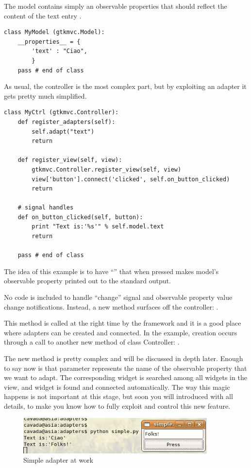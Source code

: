 The model contains simply an observable properties that should
reflect the content of the text entry .

{ \codesize
\begin{verbatim}
class MyModel (gtkmvc.Model):
    __properties__ = {
        'text' : "Ciao",
        }
    pass # end of class
\end{verbatim}
}

As usual, the controller is the most complex part, but by exploiting
an adapter it gets pretty much simplified. 
{ \codesize
\begin{verbatim}
class MyCtrl (gtkmvc.Controller):
    def register_adapters(self):
        self.adapt("text")
        return

    def register_view(self, view):
        gtkmvc.Controller.register_view(self, view)
        view['button'].connect('clicked', self.on_button_clicked)
        return

    # signal handles
    def on_button_clicked(self, button):
        print "Text is:'%s'" % self.model.text
        return

    pass # end of class
\end{verbatim}
}

The idea of this example is to have ``''
that when pressed makes model's observable property 
printed out to the standard output.

No code is included to handle  ``change''
signal and observable property value change notifications. Instead,
a new method surfaces off the controller:
.

This method is called at the right time by the framework and it is a
good place where adapters can be created and connected. In the
example, creation occurs through a call to another new method of
class Controller: . 

The new method is pretty complex and will be discussed in depth
later. Enough to say now is that parameter 
represents the name of the observable property that we want to
adapt. The corresponding widget is searched among all widgets in the
view, and widget  is found and connected
automatically. The way this magic happens is not important at this
stage, but soon you will introduced with all details, to make you
know how to fully exploit and control this new feature.

\begin{figure}[htbp]
\begin{center}
\includegraphics[width=10cm]{figs/png/adap1}
\caption{\label{ADAP1_f} Simple adapter at work}
\end{center}
\end{figure}


